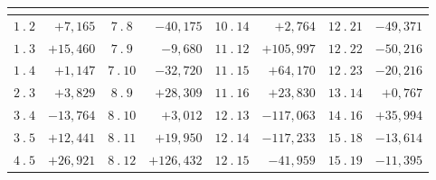 \par\medskip
{\centering
\setlength{\tabcolsep}{.24em}
\begin{tabular}{|c|r||c|r||c|r||c|r|}
&&
&&
&&
&\\[2pt]
\hline
\(1\ .\ 2\) & \(+7{,}165\) & \(7\ .\ 8\) & \(-40{,}175\) & \(10\ .\ 14\) & \(+2{,}764\) & \(12\ .\ 21\) & \(-49{,}371\)\\
\(1\ .\ 3\) & \(+15{,}460\) & \(7\ .\ 9\) & \(-9{,}680\) & \(11\ .\ 12\) & \(+105{,}997\) & \(12\ .\ 22\) & \(-50{,}216\)\\
\(1\ .\ 4\) & \(+1{,}147\) & \(7\ .\ 10\) & \(-32{,}720\) & \(11\ .\ 15\) & \(+64{,}170\) & \(12\ .\ 23\) & \(-20{,}216\)\\
\(2\ .\ 3\) & \(+3{,}829\) & \(8\ .\ 9\) & \(+28{,}309\) & \(11\ .\ 16\) & \(+23{,}830\) & \(13\ .\ 14\) & \(+0{,}767\)\\
\(3\ .\ 4\) & \(-13{,}764\) & \(8\ .\ 10\) & \(+3{,}012\) & \(12\ .\ 13\) & \(-117{,}063\) & \(14\ .\ 16\) & \(+35{,}994\)\\
\(3\ .\ 5\) & \(+12{,}441\) & \(8\ .\ 11\) & \(+19{,}950\) & \(12\ .\ 14\) & \(-117{,}233\) & \(15\ .\ 18\) & \(-13{,}614\)\\
\(4\ .\ 5\) & \(+26{,}921\) & \(8\ .\ 12\) & \(+126{,}432\) & \(12\ .\ 15\) & \(-41{,}959\) & \(15\ .\ 19\) & \(-11{,}395\)\\

\end{tabular}}
